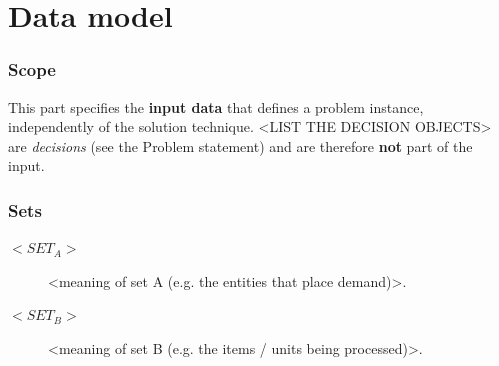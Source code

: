 %
%
%

\part{Data model}

\section{Scope}
This part specifies the \textbf{input data} that defines a problem instance,
independently of the solution technique. <LIST THE DECISION OBJECTS> are
\emph{decisions} (see the Problem statement) and are therefore \textbf{not}
part of the input.

\section{Sets}
\begin{description}
  \item[$<SET_A>$] <meaning of set A (e.g. the entities that place demand)>.
  \item[$<SET_B>$] <meaning of set B (e.g. the items / units being processed)>.
\end{description}

